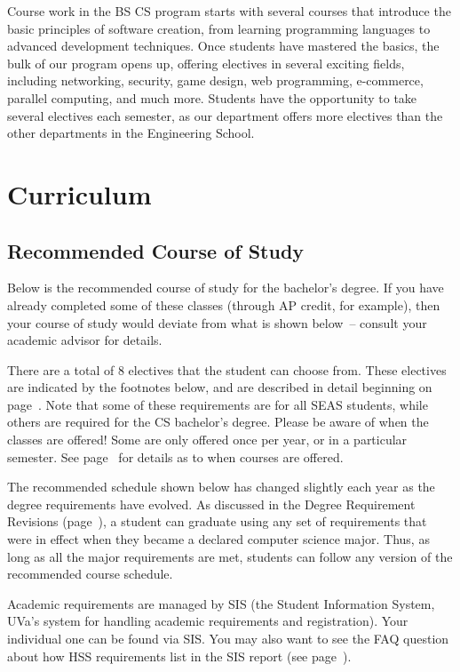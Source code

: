 \documentclass[10pt,letter]{book}
\newcommand{\mysection}[1]{\section{#1}\renewcommand{\rightmark}{#1}}
\newcommand{\myurl}[1]{\footnote{\scriptsize\url{#1}}}
\begin{document}
Course work in the BS CS program starts with several courses that
introduce the basic principles of software creation, from learning
programming languages to advanced development techniques.  Once
students have mastered the basics, the bulk of our program opens up,
offering electives in several exciting fields, including networking,
security, game design, web programming, e-commerce, parallel
computing, and much more.  Students have the opportunity to take
several electives each semester, as our department offers more
electives than the other departments in the Engineering School. 

\mysection{Curriculum}

\subsection{Recommended Course of Study}

Below is the recommended course of study for the bachelor's degree. If
you have already completed some of these classes (through AP credit,
for example), then your course of study would deviate from what is
shown below~-- consult your academic advisor for details.

There are a total of 8 electives that the student can choose
from. These electives are indicated by the footnotes below, and are
described in detail beginning on page~\pageref{sec:electiveinfo}. Note
that some of these requirements are for all SEAS students, while
others are required for the CS bachelor's degree. Please be aware of
when the classes are offered! Some are only offered once per year, or
in a particular semester. See page~\pageref{sec:coursedesc} for details
as to when courses are offered.

The recommended schedule shown below has changed slightly each year as
the degree requirements have evolved. As discussed in the Degree
Requirement Revisions (page~\pageref{sec:degreerevisions}), a student
can graduate using any set of requirements that were in effect when
they became a declared computer science major. Thus, as long as all
the major requirements are met, students can follow any version of the
recommended course schedule.

Academic requirements are managed by SIS (the Student Information
System, UVa's system for handling academic requirements and
registration).
Your individual one can be found via SIS.  You may also want to see
the FAQ question about how HSS requirements list in the SIS report
(see page~\pageref{sec:sishssissue}).
\end{document}
